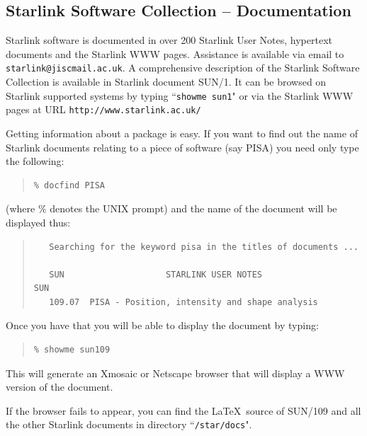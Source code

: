 \documentclass[twoside,11pt]{article}
\newcommand{\htmladdnormallink}[2]{#1}
\newcommand{\xref}[3]{#1}
\newcommand{\xlabel}[1]{}
\newcommand{\STARLINKref}{\htmladdnormallink{Starlink}{http://www.starlink.ac.uk/}}
\newcommand{\PISAref}{\xref{PISA}{sun109}{}}
\newcommand{\PISASUNref}{\xref{SUN/109}{sun109}{}}
\newcommand{\SUNONEref}{\xref{SUN/1}{sun1}{}}
\newcommand{\STARLINKWWWref}{\htmladdnormallink{Starlink WWW}{http://www.starlink.ac.uk/}}
\newcommand{\HTTPAref}{\htmladdnormallink{\tt http://www.starlink.ac.uk/}{http://www.starlink.ac.uk/}}
\begin{document}
\subsection{{\STARLINKref} Software Collection -- Documentation} \xlabel{SSC}
\label{sec:ssc}

{\STARLINKref} software is documented in over 200 Starlink User Notes, hypertext
documents and the {\STARLINKWWWref} pages. Assistance is available
via email to {\tt starlink@jiscmail.ac.uk}.
A comprehensive description of the Starlink Software
Collection is available in Starlink document {\SUNONEref}. It can be
browsed on Starlink supported systems by typing ``{\tt showme sun1}" or via the
Starlink WWW pages at URL {\HTTPAref}

Getting information about a package is easy. If you want to find out the
name of Starlink documents relating to a piece of software (say
{\PISAref}) you need only type the following:

\begin{quote}
\begin{verbatim}
% docfind PISA
\end{verbatim}
\end{quote}

(where \% denotes the UNIX prompt) and the name of the document
will be displayed thus:

\begin{quote}
\begin{verbatim}
   Searching for the keyword pisa in the titles of documents ...

   SUN                    STARLINK USER NOTES                       SUN
   109.07  PISA - Position, intensity and shape analysis
\end{verbatim}
\end{quote}

Once you have that you will be able to display the document by typing:

\begin{quote}
\begin{verbatim}
% showme sun109
\end{verbatim}
\end{quote}

This will generate an Xmosaic or Netscape browser that will display
a WWW version of the document.

If the browser fails to appear, you can find the \LaTeX\ source of {\PISASUNref}
and all the other Starlink documents in directory ``{\tt /star/docs}".
\end{document}
